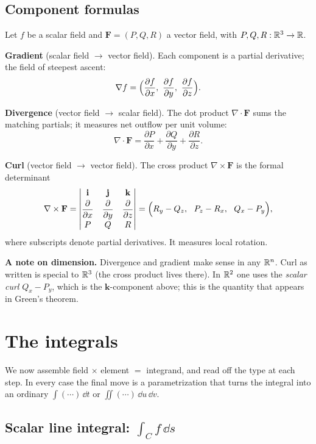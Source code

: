 \documentclass{essay}
\newcommand{\F}{\mathbf{F}}
\begin{document}
\subsection{Component formulas}

Let $f$ be a scalar field and $\F=(P,Q,R)$ a vector field, with $P,Q,R:\mathbb{R}^3\to\mathbb{R}$.

\textbf{Gradient} (scalar field $\to$ vector field). Each component is a partial
derivative; the field of steepest ascent:
\[
  \nabla f = \Bigl(\frac{\partial f}{\partial x},\ \frac{\partial f}{\partial y},\
  \frac{\partial f}{\partial z}\Bigr).
\]

\textbf{Divergence} (vector field $\to$ scalar field). The dot product
$\nabla\cdot\F$ sums the matching partials; it measures net outflow per unit volume:
\[
  \nabla\cdot\F = \frac{\partial P}{\partial x} + \frac{\partial Q}{\partial y}
  + \frac{\partial R}{\partial z}.
\]

\textbf{Curl} (vector field $\to$ vector field). The cross product
$\nabla\times\F$ is the formal determinant
\[
  \nabla\times\F =
  \begin{vmatrix}
    \mathbf{i} & \mathbf{j} & \mathbf{k} \\[2pt]
    \dfrac{\partial}{\partial x} & \dfrac{\partial}{\partial y} & \dfrac{\partial}{\partial z} \\[6pt]
    P & Q & R
  \end{vmatrix}
  =\Bigl(R_y - Q_z,\ \ P_z - R_x,\ \ Q_x - P_y\Bigr),
\]
where subscripts denote partial derivatives. It measures local rotation.

\textbf{A note on dimension.} Divergence and gradient make sense in any $\mathbb{R}^n$.
Curl as written is special to $\mathbb{R}^3$ (the cross product lives there). In $\mathbb{R}^2$ one
uses the \emph{scalar curl} $Q_x - P_y$, which is the $\mathbf{k}$-component above;
this is the quantity that appears in Green's theorem.

\section{The integrals}

We now assemble field $\times$ element $=$ integrand, and read off the type at each
step. In every case the final move is a parametrization that turns the integral into
an ordinary $\int(\cdots)\,\dd t$ or $\iint(\cdots)\,\dd u\,\dd v$.

\subsection{Scalar line integral: $\int_C f\,\dd s$}
\end{document}
